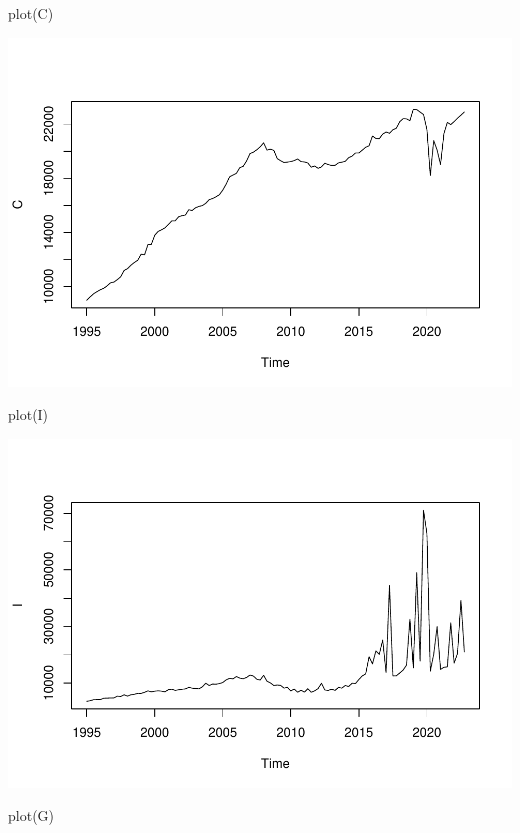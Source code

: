 \documentclass[
]{article}
\newenvironment{Shaded}{\begin{snugshade}}{\end{snugshade}}
\newcommand{\FunctionTok}[1]{\textcolor[rgb]{0.00,0.00,0.00}{#1}}
\newcommand{\NormalTok}[1]{#1}
\begin{document}
\begin{Shaded}
\begin{Highlighting}[]
\FunctionTok{plot}\NormalTok{(C)}
\end{Highlighting}
\end{Shaded}

\includegraphics{AdvMacro2_Assignment1_files/figure-latex/unnamed-chunk-2-2.pdf}

\begin{Shaded}
\begin{Highlighting}[]
\FunctionTok{plot}\NormalTok{(I)}
\end{Highlighting}
\end{Shaded}

\includegraphics{AdvMacro2_Assignment1_files/figure-latex/unnamed-chunk-2-3.pdf}

\begin{Shaded}
\begin{Highlighting}[]
\FunctionTok{plot}\NormalTok{(G)}
\end{Highlighting}
\end{Shaded}
\end{document}
